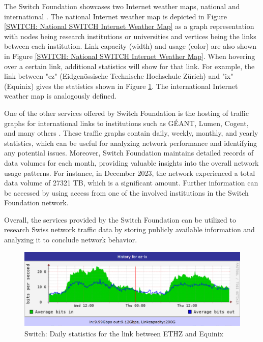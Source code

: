 \documentclass[sigconf,authorversion,nonacm]{acmart}
\begin{document}
The Switch Foundation showcases two Internet weather maps, national \cite{switchnational} and international \cite{switchinternational}. The national Internet weather map is depicted in Figure \ref{SWITCH: National SWITCH Internet Weather Map} as a graph representation with nodes being research institutions or universities and vertices being the links between each institution. Link capacity (width) and usage (color) are also shown in Figure \ref{SWITCH: National SWITCH Internet Weather Map}. When hovering over a certain link, additional statistics will show for that link. For example, the link between "ez" (Eidgenössische Technische Hochschule Zürich) and "ix" (Equinix) gives the statistics shown in Figure \ref{SWITCH: Daily statistics between ETHZ and Equinix}. The international Internet weather map is analogously defined.

One of the other services offered by Switch Foundation is the hosting of traffic graphs for international links to institutions such as GÉANT, Lumen, Cogent, and many others \cite{switchgraph}. These traffic graphs contain daily, weekly, monthly, and yearly statistics, which can be useful for analyzing network performance and identifying any potential issues. Moreover, Switch Foundation maintains detailed records of data volumes for each month, providing valuable insights into the overall network usage patterns. For instance, in December 2023, the network experienced a total data volume of 27321 TB, which is a significant amount. Further information can be accessed by using access from one of the involved institutions in the Switch Foundation network.

Overall, the services provided by the Switch Foundation can be utilized to research Swiss network traffic data by storing publicly available information and analyzing it to conclude network behavior.

\begin{figure}
    \centering
    \includegraphics[width=\linewidth]{SWITCH/stats ez-ix.PNG}
    \caption{Switch: Daily statistics for the link between ETHZ and Equinix}
    \label{SWITCH: Daily statistics between ETHZ and Equinix}
\end{figure}
\end{document}
